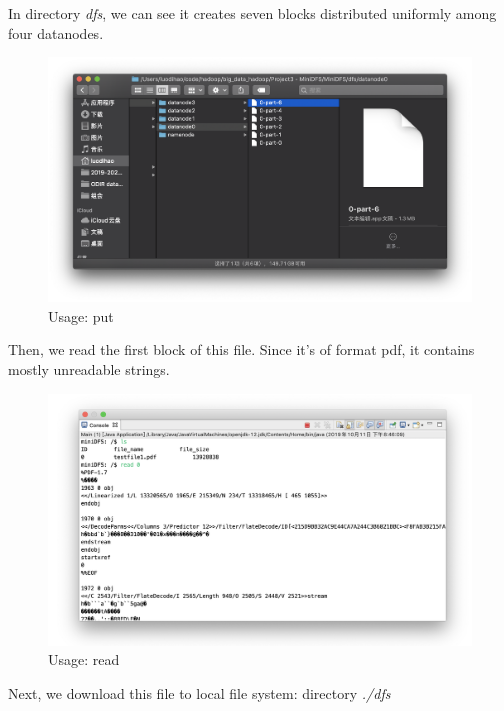\documentclass[10pt]{article}
\begin{document}
In directory \textit{dfs}, we can see it creates seven blocks distributed uniformly among four datanodes.

\begin{figure}[H]
\centerline{\includegraphics[width = 1\textwidth]{screenshot//put_02.png}}
\caption{Usage: put}
\end{figure}

Then, we read the first block of this file. Since it's of format pdf, it contains mostly unreadable strings.

\begin{figure}[H]
\centerline{\includegraphics[width = 1\textwidth]{screenshot//read_01.png}}
\caption{Usage: read}
\end{figure}

Next, we download this file to local file system: directory \textit{./dfs}
\end{document}
